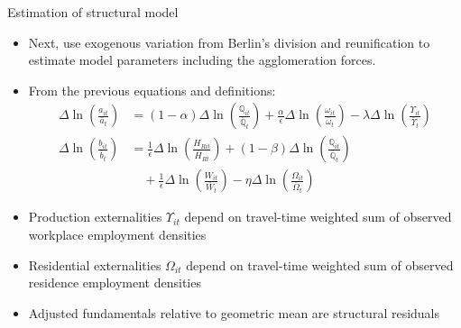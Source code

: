 \documentclass[10pt,notes=hide]{beamer}
\begin{document}
\begin{frame}{Estimation of structural model}
\begin{itemize}
\item Next, use exogenous variation from Berlin's division and reunification to estimate model parameters including the agglomeration forces. 
\item From the previous equations and definitions:
\begin{align*}
\Delta \ln\left(\frac{a_{it}}{\bar{a}_{t}} \right) 
&=
(1-\alpha) \Delta \ln \left(\frac{\mathbb{Q}_{it}}{\bar{\mathbb{Q}}_t} \right) + \frac{\alpha}{\epsilon} \Delta \ln \left(\frac{\omega_{it}}{\bar{\omega}_t} \right) - \lambda \Delta \ln \left( \frac{\Upsilon_{it}}{\bar{\Upsilon}_{t}} \right)
\\
\Delta \ln\left(\frac{b_{it}}{\bar{b}_{t}} \right) 
&=
\frac{1}{\epsilon} \Delta \ln \left(\frac{H_{Rit}}{\bar{H}_{Rt}} \right) +  (1-\beta) \Delta \ln \left(\frac{\mathbb{Q}_{it}}{\bar{\mathbb{Q}}_t} \right) \\
&\quad
+ \frac{1}{\epsilon} \Delta \ln \left(\frac{W_{it}}{\bar{W}_t} \right)   - \eta \Delta \ln \left( \frac{\Omega_{it}}{\bar{\Omega}_{t}} \right)
\end{align*}
\item Production externalities $\Upsilon_{it}$ depend on travel-time weighted sum of observed workplace employment densities
\item Residential externalities $\Omega_{it}$ depend on travel-time weighted sum of observed residence employment densities
\item Adjusted fundamentals relative to geometric mean are structural residuals
\end{itemize}
\end{frame}
\end{document}
